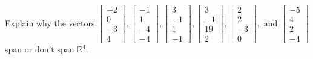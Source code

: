 \documentclass{article}
\begin{document}
\begin{exerciseStatement}
    Explain why the vectors \(\left[\begin{array}{r}
-2 \\
0 \\
-3 \\
4
\end{array}\right] , \left[\begin{array}{r}
-1 \\
1 \\
-4 \\
-4
\end{array}\right] , \left[\begin{array}{r}
3 \\
-1 \\
1 \\
-1
\end{array}\right] , \left[\begin{array}{r}
3 \\
-1 \\
19 \\
2
\end{array}\right] , \left[\begin{array}{r}
2 \\
2 \\
-3 \\
0
\end{array}\right] , \text{ and } \left[\begin{array}{r}
-5 \\
4 \\
2 \\
-4
\end{array}\right]\) span or don't span \(\mathbb{R}^4\).



  
\end{exerciseStatement}
\end{document}

